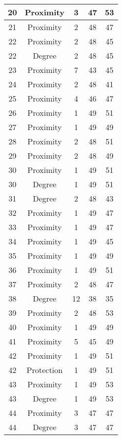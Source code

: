 \documentclass[results.tex]{subfiles}
\begin{document}
\begin{center}
\begin{tabular}{| c || c | c | c | c |}
    \hline
    20 & Proximity & 3 & 47 & 53 \\ 
    \hline
    21 & Proximity & 2 & 48 & 47 \\ 
    \hline
    22 & Proximity & 2 & 48 & 45 \\ 
    \hline
    22 & Degree & 2 & 48 & 45 \\ 
    \hline
    23 & Proximity & 7 & 43 & 45 \\ 
    \hline
    24 & Proximity & 2 & 48 & 41 \\ 
    \hline
    25 & Proximity & 4 & 46 & 47 \\ 
    \hline
    26 & Proximity & 1 & 49 & 51 \\ 
    \hline
    27 & Proximity & 1 & 49 & 49 \\ 
    \hline
    28 & Proximity & 2 & 48 & 51 \\ 
    \hline
    29 & Proximity & 2 & 48 & 49 \\ 
    \hline
    30 & Proximity & 1 & 49 & 51 \\ 
    \hline
    30 & Degree & 1 & 49 & 51 \\ 
    \hline
    31 & Degree & 2 & 48 & 43 \\ 
    \hline
    32 & Proximity & 1 & 49 & 47 \\ 
    \hline
    33 & Proximity & 1 & 49 & 47 \\ 
    \hline
    34 & Proximity & 1 & 49 & 45 \\ 
    \hline
    35 & Proximity & 1 & 49 & 49 \\ 
    \hline
    36 & Proximity & 1 & 49 & 51 \\ 
    \hline
    37 & Proximity & 2 & 48 & 47 \\ 
    \hline
    38 & Degree & 12 & 38 & 35 \\ 
    \hline
    39 & Proximity & 2 & 48 & 53 \\ 
    \hline
    40 & Proximity & 1 & 49 & 49 \\ 
    \hline
    41 & Proximity & 5 & 45 & 49 \\ 
    \hline
    42 & Proximity & 1 & 49 & 51 \\ 
    \hline
    42 & Protection & 1 & 49 & 51 \\ 
    \hline
    43 & Proximity & 1 & 49 & 53 \\ 
    \hline
    43 & Degree & 1 & 49 & 53 \\ 
    \hline
    44 & Proximity & 3 & 47 & 47 \\ 
    \hline
    44 & Degree & 3 & 47 & 47 \\ 

\end{tabular}
\end{center}
\end{document}
